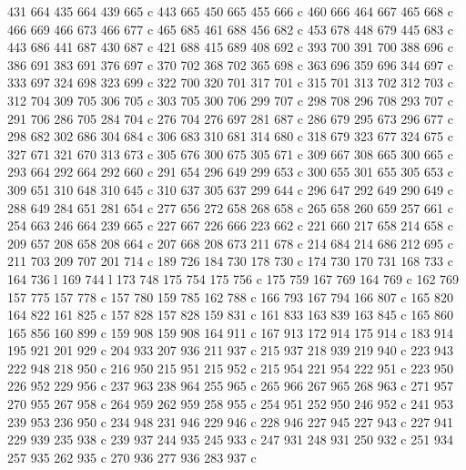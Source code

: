 {{        431 664 435 664 439 665 c
        443 665 450 665 455 666 c
        460 666 464 667 465 668 c
        466 669 466 673 466 677 c
        465 685 461 688 456 682 c
        453 678 448 679 445 683 c
        443 686 441 687 430 687 c
        421 688 415 689 408 692 c
        393 700 391 700 388 696 c
        386 691 383 691 376 697 c
        370 702 368 702 365 698 c
        363 696 359 696 344 697 c
        333 697 324 698 323 699 c
        322 700 320 701 317 701 c
        315 701 313 702 312 703 c
        312 704 309 705 306 705 c
        303 705 300 706 299 707 c
        298 708 296 708 293 707 c
        291 706 286 705 284 704 c
        276 704 276 697 281 687 c
        286 679 295 673 296 677 c
        298 682 302 686 304 684 c
        306 683 310 681 314 680 c
        318 679 323 677 324 675 c
        327 671 321 670 313 673 c
        305 676 300 675 305 671 c
        309 667 308 665 300 665 c
        293 664 292 664 292 660 c
        291 654 296 649 299 653 c
        300 655 301 655 305 653 c
        309 651 310 648 310 645 c
        310 637 305 637 299 644 c
        296 647 292 649 290 649 c
        288 649 284 651 281 654 c
        277 656 272 658 268 658 c
        265 658 260 659 257 661 c
        254 663 246 664 239 665 c
        227 667 226 666 223 662 c
        221 660 217 658 214 658 c
        209 657 208 658 208 664 c
        207 668 208 673 211 678 c
        214 684 214 686 212 695 c
        211 703 209 707 201 714 c
        189 726 184 730 178 730 c
        174 730 170 731 168 733 c
        164 736 l
        169 744 l
        173 748 175 754 175 756 c
        175 759 167 769 164 769 c
        162 769 157 775 157 778 c
        157 780 159 785 162 788 c
        166 793 167 794 166 807 c
        165 820 164 822 161 825 c
        157 828 157 828 159 831 c
        161 833 163 839 163 845 c
        165 860 165 856 160 899 c
        159 908 159 908 164 911 c
        167 913 172 914 175 914 c
        183 914 195 921 201 929 c
        204 933 207 936 211 937 c
        215 937 218 939 219 940 c
        223 943 222 948 218 950 c
        216 950 215 951 215 952 c
        215 954 221 954 222 951 c
        223 950 226 952 229 956 c
        237 963 238 964 255 965 c
        265 966 267 965 268 963 c
        271 957 270 955 267 958 c
        264 959 262 959 258 955 c
        254 951 252 950 246 952 c
        241 953 239 953 236 950 c
        234 948 231 946 229 946 c
        228 946 227 945 227 943 c
        227 941 229 939 235 938 c
        239 937 244 935 245 933 c
        247 931 248 931 250 932 c
        251 934 257 935 262 935 c
        270 936 277 936 283 937 c
}}
